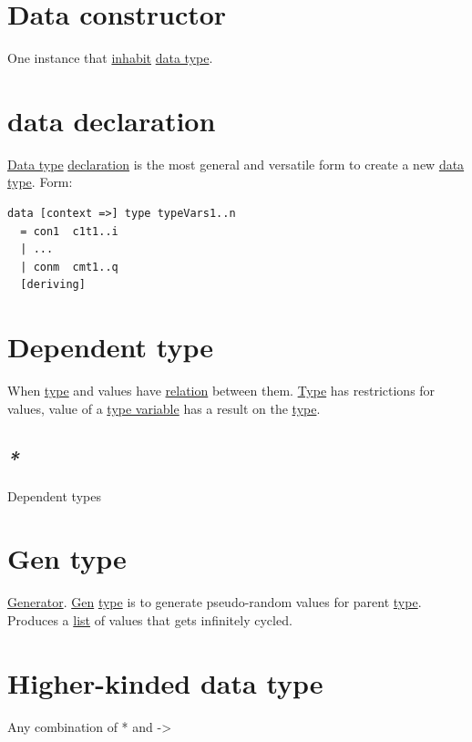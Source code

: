 \documentclass[a4paper,14pt,oneside]{book}
\begin{document}
\section{\label{org40b5390}Data constructor}
\label{sec:org9959523}
One instance that \hyperref[orgbbd2c04]{inhabit} \hyperref[org194580e]{data type}.

\section{\label{org868bdec}data declaration}
\label{sec:orgec7498a}
\hyperref[org194580e]{Data type} \hyperref[org0fb3698]{declaration} is the most general and versatile form to create a new \hyperref[org194580e]{data type}.
Form:
\begin{verbatim}
data [context =>] type typeVars1..n
  = con1  c1t1..i
  | ...
  | conm  cmt1..q
  [deriving]
\end{verbatim}

\section{\label{org2422eed}Dependent type}
\label{sec:org178271e}
When \hyperref[org1eff537]{type} and values have \hyperref[org36115b6]{relation} between them. \hyperref[org1eff537]{Type} has restrictions for values, value of a \hyperref[org2c31999]{type variable} has a result on the \hyperref[org1eff537]{type}.

\subsection{\emph{*}}
\label{sec:orga7c958e}

\label{org9baf579}Dependent types

\section{\label{org5c8bbbe}Gen type}
\label{sec:org8ce1a74}
\hyperref[org9b8f3b1]{Generator}. \hyperref[org252ad5a]{Gen} \hyperref[org1eff537]{type} is to generate pseudo-random values for parent \hyperref[org1eff537]{type}. Produces a \hyperref[orgab36b30]{list} of values that gets infinitely cycled.

\section{\label{org297d350}Higher-kinded data type}
\label{sec:org136053b}
Any combination of * and ->
\end{document}
